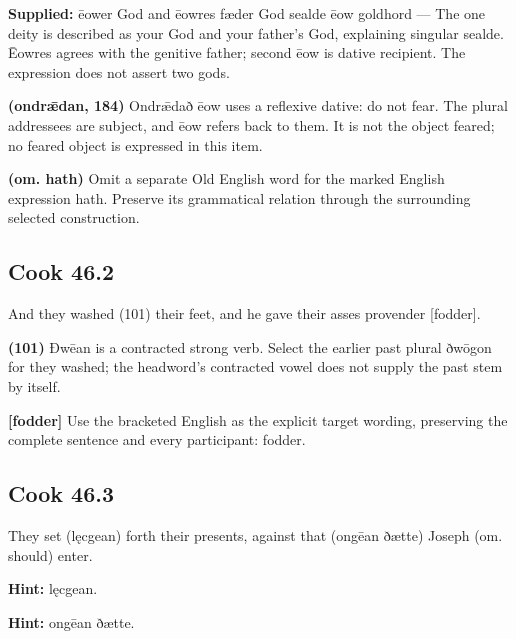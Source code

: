 \textbf{Supplied:} ēower God and ēowres fæder God sealde ēow goldhord — The one deity is described as your God and your father’s God, explaining singular sealde. Ēowres agrees with the genitive father; second ēow is dative recipient. The expression does not assert two gods.

\textbf{(ondrǣdan, 184)} Ondrǣdað ēow uses a reflexive dative: do not fear. The plural addressees are subject, and ēow refers back to them. It is not the object feared; no feared object is expressed in this item.

\textbf{(om. hath)} Omit a separate Old English word for the marked English expression hath. Preserve its grammatical relation through the surrounding selected construction.

\par\begin{minipage}{\linewidth}\raggedright
\subsection*{Cook 46.2}

And they washed (101) their feet, and he gave their asses provender [fodder].

\textbf{(101)} Ðwēan is a contracted strong verb. Select the earlier past plural ðwōgon for they washed; the headword’s contracted vowel does not supply the past stem by itself.

\textbf{[fodder]} Use the bracketed English as the explicit target wording, preserving the complete sentence and every participant: fodder.

\end{minipage}\par\addvspace{4pt}

\par\begin{minipage}{\linewidth}\raggedright
\subsection*{Cook 46.3}

They set (lęcgean) forth their presents, against that (ongēan ðætte) Joseph (om. should) enter.

\textbf{Hint:} lęcgean.

\textbf{Hint:} ongēan ðætte.

\end{minipage}\par\addvspace{4pt}

